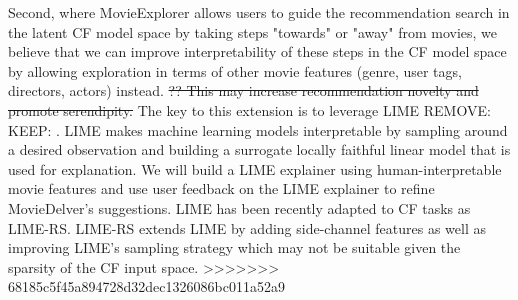 Second, where MovieExplorer allows users to guide the recommendation search in the latent CF model space by taking steps "towards" or "away" from movies, we believe that we can improve interpretability of these steps in the CF model space by allowing exploration in terms of other movie features (genre, user tags, directors, actors) instead. \st {?? This may increase recommendation novelty and promote serendipity.} The key to this extension is to leverage LIME  REMOVE: \cite{ribeiro2016model} KEEP: \cite{ribeiro2016should}. LIME makes machine learning models interpretable by sampling around a desired observation and building a surrogate locally faithful linear model that is used for explanation. We will build a LIME explainer using human-interpretable movie features and use user feedback on the LIME explainer to refine MovieDelver's suggestions. LIME has been recently adapted to CF tasks \cite{nobrega2019towards} as LIME-RS. LIME-RS extends LIME by adding side-channel features as well as improving LIME's sampling strategy which may not be suitable given the sparsity of the CF input space. 
>>>>>>> 68185c5f45a894728d32dec1326086bc011a52a9
	